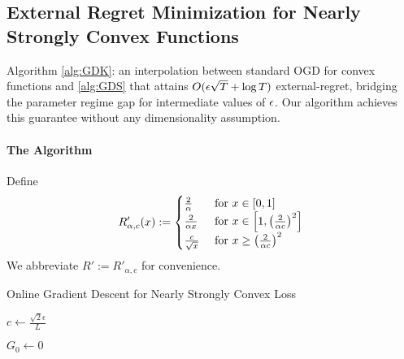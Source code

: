 \subsection{External Regret Minimization for Nearly Strongly Convex Functions}

Algorithm \ref{alg:GDK}: an interpolation between standard OGD for convex functions and \ref{alg:GDS} that attains $O(\epsilon \sqrt{T} + \log T)$ external-regret, bridging the parameter regime gap for intermediate values of $\epsilon$.  Our algorithm achieves this guarantee without any dimensionality assumption.

\paragraph{The Algorithm} Define
\begin{equation*}
    R'_{\alpha,c}(x) := \begin{cases}
        \frac{2}{\alpha} & \text{ for }x \in [0,1]\\
        \frac{2}{\alpha x} & \text{ for }x \in \left[1,\left(\frac{2}{\alpha c}\right)^2\right]\\
        \frac{c}{\sqrt{x}} & \text{ for } x \geq \left(\frac{2}{\alpha c}\right)^2
    \end{cases}
\end{equation*}
We abbreviate $R' := R'_{\alpha,c}$ for convenience.

\begin{algorithm}
\caption{Online Gradient Descent for Nearly Strongly Convex Loss}
\label{alg:GDK}

$c \gets \frac{\sqrt{2} \epsilon}{L}$

$G_0 \gets 0$


\end{algorithm}






























